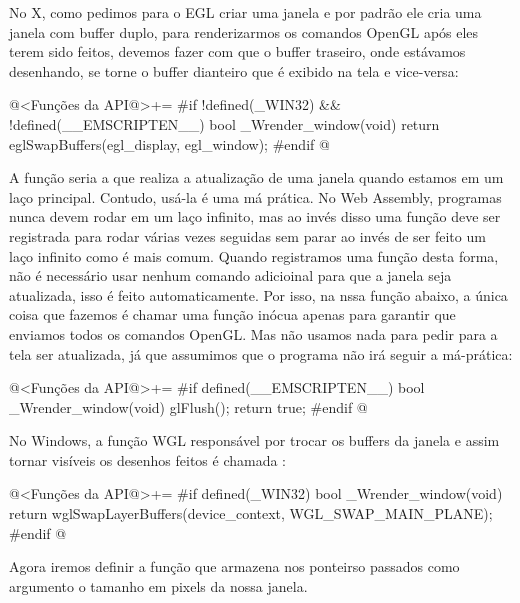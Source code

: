 
No X, como pedimos para o EGL criar uma janela e por padrão ele cria
uma janela com buffer duplo, para renderizarmos os comandos OpenGL
após eles terem sido feitos, devemos fazer com que o buffer traseiro,
onde estávamos desenhando, se torne o buffer dianteiro que é exibido
na tela e vice-versa:

\iniciocodigo
@<Funções da API@>+=
#if !defined(_WIN32) && !defined(__EMSCRIPTEN__)
bool _Wrender_window(void){
  return eglSwapBuffers(egl_display, egl_window);
}
#endif
@
\fimcodigo


A função  seria a que realiza a
atualização de uma janela quando estamos em um laço
principal. Contudo, usá-la é uma má prática. No Web Assembly,
programas nunca devem rodar em um laço infinito, mas ao invés disso
uma função deve ser registrada para rodar várias vezes seguidas sem
parar ao invés de ser feito um laço infinito como é mais comum. Quando
registramos uma função desta forma, não é necessário usar nenhum
comando adicioinal para que a janela seja atualizada, isso é feito
automaticamente. Por isso, na nssa função abaixo, a única coisa que
fazemos é chamar uma função inócua apenas para garantir que enviamos
todos os comandos OpenGL. Mas não usamos nada para pedir para a tela
ser atualizada, já que assumimos que o programa não irá seguir a
má-prática:

\iniciocodigo
@<Funções da API@>+=
#if defined(__EMSCRIPTEN__)
bool _Wrender_window(void){
  glFlush();
  return true;
}
#endif
@
\fimcodigo


No Windows, a função WGL responsável por trocar os buffers da janela e
assim tornar visíveis os desenhos feitos é
chamada :

\iniciocodigo
@<Funções da API@>+=
#if defined(_WIN32)
bool _Wrender_window(void){
  return wglSwapLayerBuffers(device_context, WGL_SWAP_MAIN_PLANE);
}
#endif
@
\fimcodigo


Agora iremos definir a função que armazena nos ponteirso passados como
argumento o tamanho em pixels da nossa janela.


